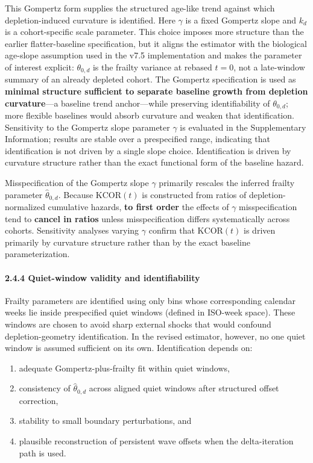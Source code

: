 \documentclass[
]{article}
\providecommand{\tightlist}{%
  \setlength{\itemsep}{0pt}\setlength{\parskip}{0pt}}
\begin{document}
This Gompertz form supplies the structured age-like trend against which
depletion-induced curvature is identified. Here \(\gamma\) is a fixed
Gompertz slope and \(k_d\) is a cohort-specific scale parameter. This
choice imposes more structure than the earlier flatter-baseline
specification, but it aligns the estimator with the biological age-slope
assumption used in the v7.5 implementation and makes the parameter of
interest explicit: \(\theta_{0,d}\) is the frailty variance at rebased
\(t=0\), not a late-window summary of an already depleted cohort. The
Gompertz specification is used as \textbf{minimal structure sufficient
to separate baseline growth from depletion curvature}---a baseline trend
anchor---while preserving identifiability of \(\theta_{0,d}\); more
flexible baselines would absorb curvature and weaken that
identification. Sensitivity to the Gompertz slope parameter \(\gamma\)
is evaluated in the Supplementary Information; results are stable over a
prespecified range, indicating that identification is not driven by a
single slope choice. Identification is driven by curvature structure
rather than the exact functional form of the baseline hazard.

Misspecification of the Gompertz slope \(\gamma\) primarily rescales the
inferred frailty parameter \(\hat{\theta}_{0,d}\). Because
\(\mathrm{KCOR}(t)\) is constructed from ratios of depletion-normalized
cumulative hazards, \textbf{to first order} the effects of \(\gamma\)
misspecification tend to \textbf{cancel in ratios} unless
misspecification differs systematically across cohorts. Sensitivity
analyses varying \(\gamma\) confirm that \(\mathrm{KCOR}(t)\) is driven
primarily by curvature structure rather than by the exact baseline
parameterization.

\paragraph{2.4.4 Quiet-window validity and
identifiability}\label{quiet-window-validity-and-identifiability}

Frailty parameters are identified using only bins whose corresponding
calendar weeks lie inside prespecified quiet windows (defined in
ISO-week space). These windows are chosen to avoid sharp external shocks
that would confound depletion-geometry identification. In the revised
estimator, however, no one quiet window is assumed sufficient on its
own. Identification depends on:

\begin{enumerate}
\def\labelenumi{\arabic{enumi}.}
\tightlist
\item
  adequate Gompertz-plus-frailty fit within quiet windows,
\item
  consistency of \(\hat{\theta}_{0,d}\) across aligned quiet windows
  after structured offset correction,
\item
  stability to small boundary perturbations, and
\item
  plausible reconstruction of persistent wave offsets when the
  delta-iteration path is used.
\end{enumerate}
\end{document}
